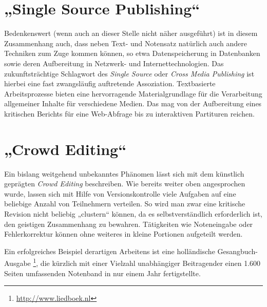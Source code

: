 \documentclass[DIV=12]{scrreprt}
\begin{document}
\section{„Single Source Publishing“}
\label{sec:pt_single-source-publishing}
Bedenkenswert (wenn auch an dieser Stelle nicht näher ausgeführt) ist in diesem Zusammenhang auch, dass neben Text- und Notensatz natürlich auch andere Techniken zum Zuge kommen können, so etwa Datenspeicherung in Datenbanken sowie deren Aufbereitung in Netzwerk- und Internettechnologien.
Das zukunftsträchtige Schlagwort des \emph{Single Source} oder \emph{Cross Media Publishing} ist hierbei eine fast zwangsläufig auftretende Assoziation.
Textbasierte Arbeitsprozesse bieten eine hervorragende Materialgrundlage für die Verarbeitung allgemeiner Inhalte für verschiedene Medien.
Das mag von der Aufbereitung eines kritischen Berichts für eine Web-Abfrage bis zu interaktiven Partituren reichen.

\section{„Crowd Editing“}
\label{sec:pt_crowd-editing}
Ein bislang weitgehend unbekanntes Phänomen lässt sich mit dem künstlich geprägten \emph{Crowd Editing} beschreiben.
Wie bereits weiter oben angesprochen wurde, lassen sich mit Hilfe von Versionskontrolle viele Aufgaben auf eine beliebige Anzahl von Teilnehmern verteilen.
So wird man zwar eine kritische Revision nicht beliebig „clustern“ können, da es selbstverständlich erforderlich ist, den geistigen Zusammenhang zu bewahren.
Tätigkeiten wie Noteneingabe oder Fehlerkorrektur können ohne weiteres in kleine Portionen aufgeteilt werden.

Ein erfolgreiches Beispiel derartigen Arbeitens ist eine holländische Gesangbuch-Ausgabe%
\footnote{\url{http://www.liedboek.nl}},
die kürzlich mit einer Vielzahl unabhängiger Beitragender einen 1.600 Seiten umfassenden Notenband in nur einem Jahr fertigstellte.
\end{document}
